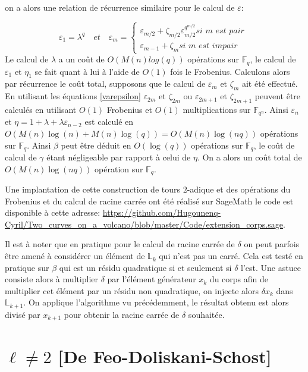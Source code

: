 \documentclass[10pt,a4paper]{book}
\theoremstyle{plain}
\theoremstyle{definition}
\theoremstyle{definition}
\theoremstyle{definition}
\theoremstyle{definition}
\theoremstyle{remark}
\theoremstyle{remark}
\begin{document}
 on a alors une relation de récurrence similaire pour le calcul de $\varepsilon$:

\begin{equation}
\label{eq:varepsilon}
\varepsilon_1=\lambda^q \quad \textit{et} \quad
\varepsilon_m=
\begin{cases} 
\varepsilon_{m/2} + \zeta_{m/2}\varepsilon_{m/2}^{q^{m/2}} \textit{si m est pair }\\
\varepsilon_{m-1} + \zeta_{m} \textit{si m est impair}
\end{cases}
\end{equation}
Le calcul de $\lambda$ a un coût de $O(M(n)log(q))$ opérations sur $\mathbb{F}_q$, le calcul de $\varepsilon_1$ et $\eta_1$ se fait quant à lui à l'aide de $O(1)$ fois le Frobenius. Calculons alors par récurrence le coût total, supposons que le calcul de $\varepsilon_m$ et $\zeta_m$ ait été effectué. En utilisant les équations \ref{varepsilon} $\varepsilon_{2m}$ et $\zeta_{2m}$ ou $\varepsilon_{2m+1}$ et $\zeta_{2m+1}$ peuvent être calculés en utilisant $O(1)$ Frobenius et $O(1)$ multiplications sur $\mathbb{F}_{q^n}$. Ainsi $\varepsilon_n$ et $\eta=1+\lambda+\lambda\varepsilon_{n-2}$ est calculé en $O(M(n)\log(n)+M(n)\log(q))=O(M(n)\log(nq))$ opérations sur $\mathbb{F}_q$.
Ainsi $\beta$ peut être déduit en $O(\log(q))$ opérations sur $\mathbb{F}_q$, le coût de calcul de $\gamma$ étant négligeable par rapport à celui de $\eta$. On a alors un coût total de $O(M(n)\log(nq))$ opération sur $\mathbb{F}_q$.

Une implantation de cette construction de tours $2$-adique et des opérations du Frobenius et du calcul de racine carrée ont été réalisé sur SageMath le code est disponible à cette adresse: \url{https://github.com/Hugounenq-Cyril/Two_curves_on_a_volcano/blob/master/Code/extension_corps.sage}.

Il est à noter que en pratique pour le calcul de racine carrée de $\delta$ on peut parfois être amené à considérer un élément de $\mathbb{L}_k$ qui n'est pas un carré. Cela est testé en pratique sur $\beta$ qui est un résidu quadratique si et seulement si $\delta$ l'est. Une astuce consiste alors à multiplier $\delta$ par l'élément générateur $x_{k}$ du corps afin  de multiplier cet élément par un résidu non quadratique, on injecte alors $\delta x_k$ dans $\mathbb{L}_{k+1}$. On applique l'algorithme vu précédemment, le résultat obtenu est alors divisé par $x_{k+1}$ pour obtenir la racine carrée de $\delta$ souhaitée.


\section{$\ell \neq 2$ [De Feo-Doliskani-Schost]}
\end{document}

